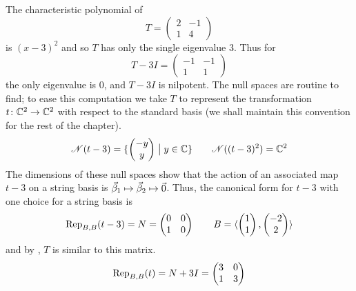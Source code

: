 \begin{example}   \label{ex:SingJordBlock}
The characteristic polynomial of
\begin{equation*}
  T=\begin{pmatrix}
      2  &-1  \\
      1  &4
    \end{pmatrix}
\end{equation*}
is \( (x-3)^2 \) and so \( T \) has only the single eigenvalue \( 3 \).
Thus for 
\begin{equation*}
  T-3I=\begin{pmatrix}
     -1  &-1  \\
      1  &1
    \end{pmatrix}
\end{equation*}
the only eigenvalue is \( 0 \), and \( T-3I \) is nilpotent.
The null spaces are routine to find; to ease this computation we take 
$T$ to represent the transformation $\map{t}{\C^2}{\C^2}$ with respect to
the standard basis (we shall maintain this convention
for the rest of the chapter). 
\begin{equation*}
   \nullspace{t-3}=\set{\colvec{-y \\ y}\suchthat y\in\C}
   \qquad
   \nullspace{(t-3)^2}=\C^2
\end{equation*}
The dimensions of these null spaces
show that the action of an associated map $t-3$ on a string basis is
$\vec{\beta}_1\mapsto\vec{\beta}_2\mapsto\zero$.
Thus, the canonical form for $t-3$
with one choice for a string basis is
\begin{equation*}
  \rep{t-3}{B,B}
  =N
  =\begin{pmatrix}
      0  &0   \\
      1  &0
    \end{pmatrix}
  \qquad
  B=\sequence{\colvec{1 \\ 1},\colvec{-2 \\ 2}}
\end{equation*}
and by , \( T \) is similar to
this matrix.
\begin{equation*}
  \rep{t}{B,B}=
  N+3I=
  \begin{pmatrix}
     3  &0  \\
     1  &3
  \end{pmatrix}
\end{equation*}


\end{example}
